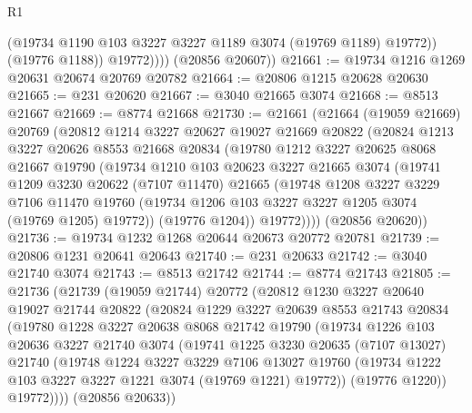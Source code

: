 \begin{lexlean}{R1}
\begin{coremodule}
                  (@19734 @1190 @103 @3227 @3227 @1189 @3074 (@19769 @1189) @19772))
                (@19776 @1188))
              @19772))))
      (@20856 @20607))
@21661 := @19734 @1216 @1269 @20631 @20674 @20769 @20782
@21664 := @20806 @1215 @20628 @20630
@21665 := @231 @20620
@21667 := @3040 @21665 @3074
@21668 := @8513 @21667
@21669 := @8774 @21668
@21730 := @21661
    (@21664
      (@19059 @21669)
      @20769
      (@20812
        @1214
        @3227
        @20627
        @19027
        @21669
        @20822
        (@20824
          @1213
          @3227
          @20626
          @8553
          @21668
          @20834
          (@19780
            @1212
            @3227
            @20625
            @8068
            @21667
            @19790
            (@19734
              @1210
              @103
              @20623
              @3227
              @21665
              @3074
              (@19741
                @1209
                @3230
                @20622
                (@7107 @11470)
                @21665
                (@19748
                  @1208
                  @3227
                  @3229
                  @7106
                  @11470
                  @19760
                  (@19734 @1206 @103 @3227 @3227 @1205 @3074 (@19769 @1205) @19772))
                (@19776 @1204))
              @19772))))
      (@20856 @20620))
@21736 := @19734 @1232 @1268 @20644 @20673 @20772 @20781
@21739 := @20806 @1231 @20641 @20643
@21740 := @231 @20633
@21742 := @3040 @21740 @3074
@21743 := @8513 @21742
@21744 := @8774 @21743
@21805 := @21736
    (@21739
      (@19059 @21744)
      @20772
      (@20812
        @1230
        @3227
        @20640
        @19027
        @21744
        @20822
        (@20824
          @1229
          @3227
          @20639
          @8553
          @21743
          @20834
          (@19780
            @1228
            @3227
            @20638
            @8068
            @21742
            @19790
            (@19734
              @1226
              @103
              @20636
              @3227
              @21740
              @3074
              (@19741
                @1225
                @3230
                @20635
                (@7107 @13027)
                @21740
                (@19748
                  @1224
                  @3227
                  @3229
                  @7106
                  @13027
                  @19760
                  (@19734 @1222 @103 @3227 @3227 @1221 @3074 (@19769 @1221) @19772))
                (@19776 @1220))
              @19772))))
      (@20856 @20633))

\end{coremodule}
\end{lexlean}
